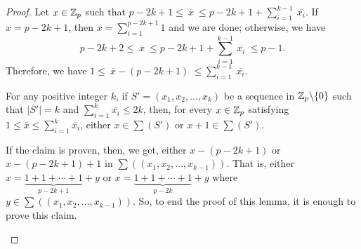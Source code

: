 \documentclass[fleqn]{mat01}
\begin{document}
\begin{proof}
Let $x\in{\Bbb Z}_p$ such that $p-2k+1\leq \ \overline{x} \ \leq
p-2k+1+\sum_{i=1}^{k-1}\ \overline{x_i}$. If $x = p-2k+1$, then $x =
\sum_{i=1}^{p-2k+1} 1$ and we are done; otherwise, we have
\begin{equation*}
p-2k+2\leq \ \overline{x} \ \leq p-2k+1+\sum_{i=1}^{k-1} \
\overline{x_i} \ \leq p-1.
\end{equation*}
Therefore, we have $1\leq \ \overline{x} - (p-2k+1) \ \leq
\sum_{i=1}^{k-1} \ \overline{x_i}$.

\begin{claim} For any positive integer $k$, if $S' = (x_1,x_2,\ldots,
x_{k})$ be a sequence in ${\Bbb Z}_p\backslash\{0\}$ such that $|S'| =
k$ and $\sum_{i=1}^k\overline{x_i}\leq 2k$, then, for every $x\in {\Bbb
Z}_p$ satisfying $1\leq \overline{x} \leq \sum_{i=1}^k\overline{x_i}$,
either $x\in\sum(S')$ or $x+1\in \sum(S')$.

If the claim is proven, then, we get, either $x -(p-2k+1)$ or
$x-(p-2k+1)+1$ in $\sum((x_1,x_2,\ldots,x_{k-1}))$. That is, either $x =
\underbrace{1+1+ \cdots+1}_{p-2k+1}+y$ or $x =
\underbrace{1+1+\cdots+1}_{p-2k}+y$ where $y\in
\sum((x_1,x_2,\ldots,x_{k-1}))$. So, to end the proof of this lemma, it
is enough to prove this claim.\vspace{.7pc}
\end{claim}


\end{proof}
\end{document}

